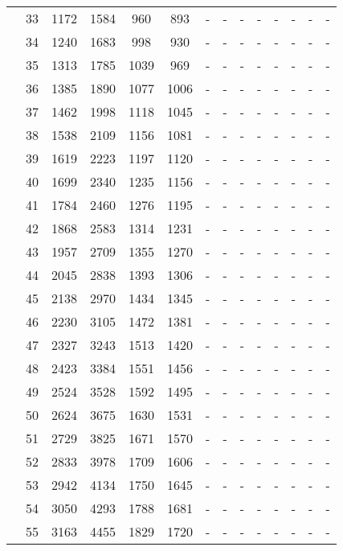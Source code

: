 \begin{table}[htb]
{\begin{tabular}{|c|c|c|c|c|c|c|c|c|c|c|c|c|c|}
 & 
33 & 1172 & 1584 & 960 & 893
 & - & -
 & - & -
 & - & -
 & - & -
 \\
 & 
34 & 1240 & 1683 & 998 & 930
 & - & -
 & - & -
 & - & -
 & - & -
 \\
 & 
35 & 1313 & 1785 & 1039 & 969
 & - & -
 & - & -
 & - & -
 & - & -
 \\
 & 
36 & 1385 & 1890 & 1077 & 1006
 & - & -
 & - & -
 & - & -
 & - & -
 \\
 & 
37 & 1462 & 1998 & 1118 & 1045
 & - & -
 & - & -
 & - & -
 & - & -
 \\
 & 
38 & 1538 & 2109 & 1156 & 1081
 & - & -
 & - & -
 & - & -
 & - & -
 \\
 & 
39 & 1619 & 2223 & 1197 & 1120
 & - & -
 & - & -
 & - & -
 & - & -
 \\
 & 
40 & 1699 & 2340 & 1235 & 1156
 & - & -
 & - & -
 & - & -
 & - & -
 \\
 & 
41 & 1784 & 2460 & 1276 & 1195
 & - & -
 & - & -
 & - & -
 & - & -
 \\
 & 
42 & 1868 & 2583 & 1314 & 1231
 & - & -
 & - & -
 & - & -
 & - & -
 \\
 & 
43 & 1957 & 2709 & 1355 & 1270
 & - & -
 & - & -
 & - & -
 & - & -
 \\
 & 
44 & 2045 & 2838 & 1393 & 1306
 & - & -
 & - & -
 & - & -
 & - & -
 \\
 & 
45 & 2138 & 2970 & 1434 & 1345
 & - & -
 & - & -
 & - & -
 & - & -
 \\
 & 
46 & 2230 & 3105 & 1472 & 1381
 & - & -
 & - & -
 & - & -
 & - & -
 \\
 & 
47 & 2327 & 3243 & 1513 & 1420
 & - & -
 & - & -
 & - & -
 & - & -
 \\
 & 
48 & 2423 & 3384 & 1551 & 1456
 & - & -
 & - & -
 & - & -
 & - & -
 \\
 & 
49 & 2524 & 3528 & 1592 & 1495
 & - & -
 & - & -
 & - & -
 & - & -
 \\
 & 
50 & 2624 & 3675 & 1630 & 1531
 & - & -
 & - & -
 & - & -
 & - & -
 \\
 & 
51 & 2729 & 3825 & 1671 & 1570
 & - & -
 & - & -
 & - & -
 & - & -
 \\
 & 
52 & 2833 & 3978 & 1709 & 1606
 & - & -
 & - & -
 & - & -
 & - & -
 \\
 & 
53 & 2942 & 4134 & 1750 & 1645
 & - & -
 & - & -
 & - & -
 & - & -
 \\
 & 
54 & 3050 & 4293 & 1788 & 1681
 & - & -
 & - & -
 & - & -
 & - & -
 \\
 & 
55 & 3163 & 4455 & 1829 & 1720
 & - & -
 & - & -
 & - & -
 & - & -
 \\

\end{tabular}}
\end{table}
